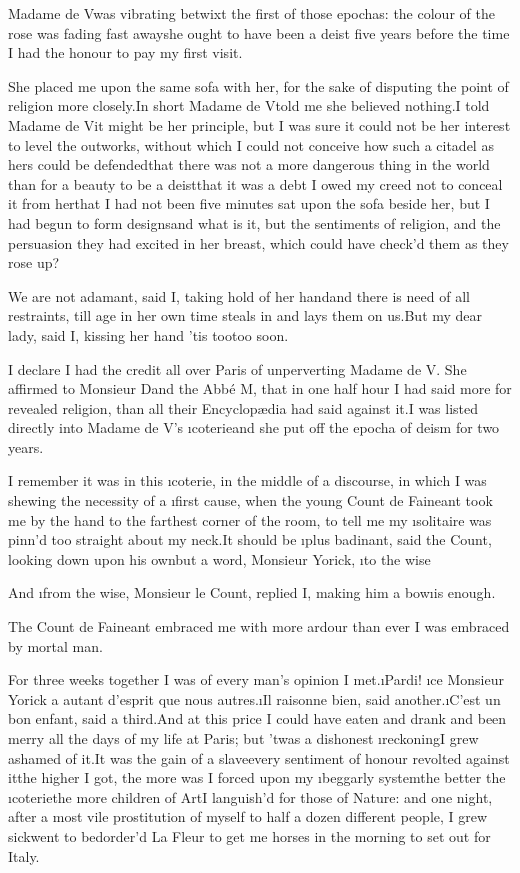 \documentclass[twoside]{article}
\begin{document}
Madame de V\tskk  was vibrating betwixt
the first of those epochas: the colour of
the rose was fading fast away\tskk she
ought to have been a deist five years
before the time I had the honour to pay my
first visit.

She placed me upon the same sofa with her,
for the sake of disputing the point of
religion more closely.\tskk In short
Madame de V\tskk  told me she believed
nothing.\tskk I told Madame de V\tskk  it
might be her principle, but I was sure it
could not be her interest to level the
outworks, without which I could not
conceive how such a citadel as hers could
be defended\tskk that there was not a
more dangerous thing in the world than for
a beauty to be a deist\tskk that it was a
debt I owed my creed not to conceal it
from her\tskk that I had not been five
minutes sat upon the sofa beside her, but
I had begun to form designs\tskk and what
is it, but the sentiments of religion, and
the persuasion they had excited in her
breast, which could have check’d them as
they rose up?

We are not adamant, said I, taking hold of
her hand\tskk and there is need of all
restraints, till age in her own time
steals in and lays them on us.\tskk But my
dear lady, said I, kissing her hand\tskk
’tis too\tskk too soon.

I declare I had the credit all over Paris
of unperverting Madame de V\tskk .\tskk
She affirmed to Monsieur D\tskk  and the
Abbé M\tskk , that in one half hour I had
said more for revealed religion, than all
their Encyclopædia had said against
it.\tskk I was listed directly into Madame
de V\tskk ’s \i{coterie}\tskk and she put
off the epocha of deism for two years.

I remember it was in this \i{coterie}, in
the middle of a discourse, in which I was
shewing the necessity of a \i{first}
cause, when the young Count de Faineant
took me by the hand to the farthest corner
of the room, to tell me my \i{solitaire}
was pinn’d too straight about my
neck.\tskk It should be \i{plus badinant},
said the Count, looking down upon his
own\tskk but a word, Monsieur Yorick,
\i{to the wise}\tskk 

And \i{from the wise}, Monsieur le Count,
replied I, making him a bow\tskk \i{is
enough}.

The Count de Faineant embraced me with
more ardour than ever I was embraced by
mortal man.

For three weeks together I was of every
man’s opinion I met.\tskk \i{Pardi}! \i{ce
Monsieur Yorick a autant d’esprit que nous
autres}.\tskk \i{Il raisonne bien}, said
another.\tskk \i{C’est un bon enfant},
said a third.\tskk And at this price I
could have eaten and drank and been merry
all the days of my life at Paris; but
’twas a dishonest \i{reckoning}\tskk I
grew ashamed of it.\tskk It was the gain
of a slave\tskk every sentiment of honour
revolted against it\tskk the higher I
got, the more was I forced upon my
\i{beggarly system}\tskk the better the
\i{coterie}\tskk the more children of
Art\tskk I languish’d for those of
Nature: and one night, after a most vile
prostitution of myself to half a dozen
different people, I grew sick\tskk went
to bed\tskk order’d La Fleur to get me
horses in the morning to set out for
Italy.
\end{document}
